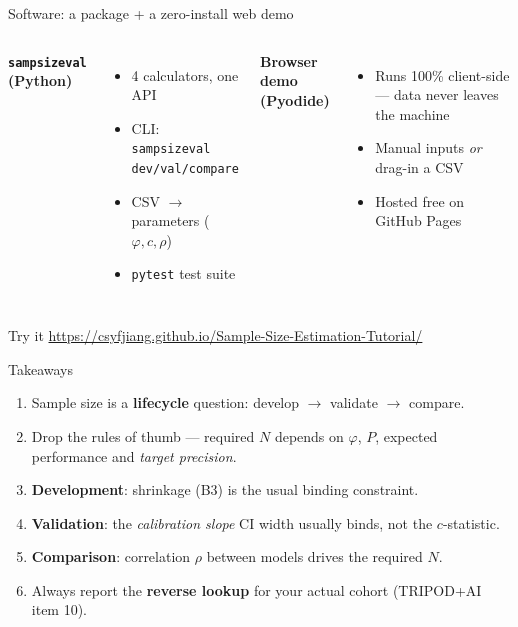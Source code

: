 \documentclass[10pt,aspectratio=169]{beamer}
\newcommand{\stagechip}[2]{\textcolor{#1}{\textbf{#2}}}
\begin{document}
\begin{frame}{Software: a package + a zero-install web demo}
  \begin{columns}[t]
      \textbf{\texttt{sampsizeval} (Python)}
      \begin{itemize}
        \item 4 calculators, one API
        \item CLI: \texttt{sampsizeval dev/val/compare}
        \item CSV $\rightarrow$ parameters ($\varphi, c, \rho$)
        \item \texttt{pytest} test suite
      \end{itemize}
      \textbf{Browser demo (Pyodide)}
      \begin{itemize}
        \item Runs 100\% client-side --- data never leaves the machine
        \item Manual inputs \emph{or} drag-in a CSV
        \item Hosted free on GitHub Pages
      \end{itemize}
  \end{columns}
  \vfill
  \begin{exampleblock}{Try it}
    \centering \url{https://csyfjiang.github.io/Sample-Size-Estimation-Tutorial/}
  \end{exampleblock}
\end{frame}

\begin{frame}{Takeaways}
  \begin{enumerate}
    \item Sample size is a \textbf{lifecycle} question: develop $\rightarrow$ validate $\rightarrow$ compare.
    \item Drop the rules of thumb --- required $N$ depends on $\varphi$, $P$, expected performance and \emph{target precision}.
    \item \stagechip{devcol}{Development}: shrinkage (B3) is the usual binding constraint.
    \item \stagechip{valcol}{Validation}: the \emph{calibration slope} CI width usually binds, not the $c$-statistic.
    \item \stagechip{cmpcol}{Comparison}: correlation $\rho$ between models drives the required $N$.
    \item Always report the \textbf{reverse lookup} for your actual cohort (TRIPOD+AI item 10).
  \end{enumerate}
\end{frame}
\end{document}

